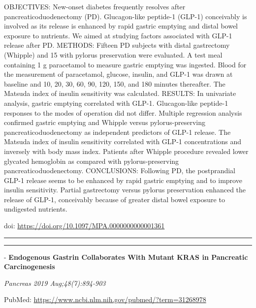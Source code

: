 \documentclass[]{article}
\begin{document}
OBJECTIVES: New-onset diabetes frequently resolves after
pancreaticoduodenectomy (PD). Glucagon-like peptide-1 (GLP-1)
conceivably is involved as its release is enhanced by rapid gastric
emptying and distal bowel exposure to nutrients. We aimed at studying
factors associated with GLP-1 release after PD. METHODS: Fifteen PD
subjects with distal gastrectomy (Whipple) and 15 with pylorus
preservation were evaluated. A test meal containing 1 g paracetamol to
measure gastric emptying was ingested. Blood for the measurement of
paracetamol, glucose, insulin, and GLP-1 was drawn at baseline and 10,
20, 30, 60, 90, 120, 150, and 180 minutes thereafter. The Matsuda index
of insulin sensitivity was calculated. RESULTS: In univariate analysis,
gastric emptying correlated with GLP-1. Glucagon-like peptide-1
responses to the modes of operation did not differ. Multiple regression
analysis confirmed gastric emptying and Whipple versus
pylorus-preserving pancreaticoduodenectomy as independent predictors of
GLP-1 release. The Matsuda index of insulin sensitivity correlated with
GLP-1 concentrations and inversely with body mass index. Patients after
Whipple procedure revealed lower glycated hemoglobin as compared with
pylorus-preserving pancreaticoduodenectomy. CONCLUSIONS: Following PD,
the postprandial GLP-1 release seems to be enhanced by rapid gastric
emptying and to improve insulin sensitivity. Partial gastrectomy versus
pylorus preservation enhanced the release of GLP-1, conceivably because
of greater distal bowel exposure to undigested nutrients.

doi: \url{https://doi.org/10.1097/MPA.0000000000001361}

{}

{}

\begin{center}\rule{0.5\linewidth}{\linethickness}\end{center}

\begin{center}\rule{0.5\linewidth}{\linethickness}\end{center}

 - \textbf{Endogenous Gastrin Collaborates With Mutant KRAS in
Pancreatic Carcinogenesis}

\emph{Pancreas 2019 Aug;48(7):894-903}

PubMed: \url{https://www.ncbi.nlm.nih.gov/pubmed/?term=31268978}
\end{document}
